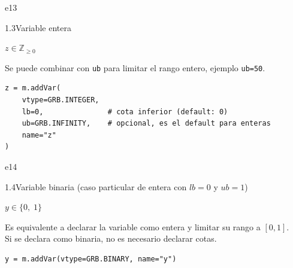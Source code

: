 \documentclass[10pt,a4paper]{article}
\newlength{\mathcolw}
\newlength{\codecolw}
\newcommand{\entryheader}[2][]{%
  \needspace{5cm}%
  \vspace{6pt}%
  \ifx\relax#1\relax\else\phantomsection\hypertarget{#1}{}\fi%
  \noindent%
  \begin{tcolorbox}[
    colback=subsecbg!18,
    colframe=subsecbg!45,
    sharp corners, boxrule=0.4pt,
    left=5pt, right=5pt, top=2pt, bottom=2pt,
    fontupper=\small\bfseries\sffamily,
  ]
  #2
  \end{tcolorbox}%
  \vspace{2pt}%
}
\newcommand{\py}[1]{\texttt{\small #1}}
\begin{document}
\entryheader[e13]{1.3\quad Variable entera}
\noindent
\begin{minipage}[t]{\mathcolw}
    \begin{tcolorbox}[mathbox]
        $z \in \mathbb{Z}_{\geq 0}$
    \end{tcolorbox}
    \vspace{2pt}
    \begin{tcolorbox}[notebox]
        Se puede combinar con \py{ub} para limitar el rango entero, ejemplo \py{ub=50}.
    \end{tcolorbox}
\end{minipage}\hspace{0.02\textwidth}%
\begin{minipage}[t]{\codecolw}
    \begin{lstlisting}[style=gurobipy]
z = m.addVar(
    vtype=GRB.INTEGER,
    lb=0,               # cota inferior (default: 0)
    ub=GRB.INFINITY,    # opcional, es el default para enteras
    name="z"
)
\end{lstlisting}
\end{minipage}

\vspace{4pt}

\entryheader[e14]{1.4\quad Variable binaria (caso particular de entera con $lb=0$ y $ub=1$)}
\noindent
\begin{minipage}[t]{\mathcolw}
    \begin{tcolorbox}[mathbox]
        $y \in \{0,\; 1\}$
    \end{tcolorbox}
    \vspace{2pt}
    \begin{tcolorbox}[notebox]
        Es equivalente a declarar la variable como entera y limitar su rango a $[0,1]$.\\
        Si se declara como binaria, no es necesario declarar cotas.
    \end{tcolorbox}
\end{minipage}\hspace{0.02\textwidth}%
\begin{minipage}[t]{\codecolw}
    \begin{lstlisting}[style=gurobipy]
y = m.addVar(vtype=GRB.BINARY, name="y")
\end{lstlisting}
\end{minipage}

\vspace{4pt}
\end{document}
